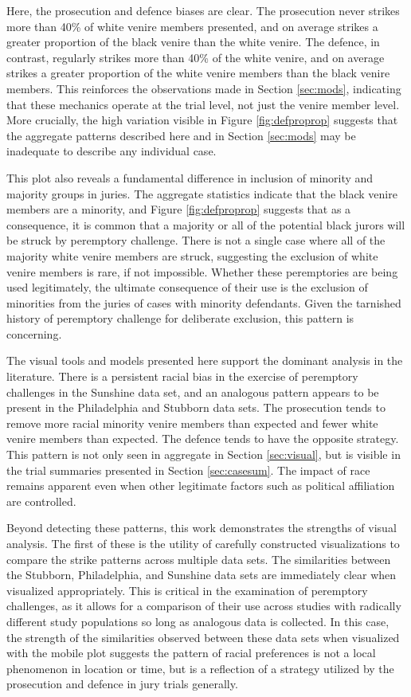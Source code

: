 \documentclass[12pt]{article}
\begin{document}
Here, the prosecution and defence biases are clear. The prosecution never strikes more than 40\% of white venire members presented, and on average strikes a greater proportion of the black venire than the white venire. The defence, in contrast, regularly strikes more than 40\% of the white venire, and on average strikes a greater proportion of the white venire members than the black venire members. This reinforces the observations made in Section \ref{sec:mods}, indicating that these mechanics operate at the trial level, not just the venire member level. More crucially, the high variation visible in Figure \ref{fig:defproprop} suggests that the aggregate patterns described here and in Section \ref{sec:mods} may be inadequate to describe any individual case.

This plot also reveals a fundamental difference in inclusion of minority and majority groups in juries. The aggregate statistics indicate that the black venire members are a minority, and Figure \ref{fig:defproprop} suggests that as a consequence, it is common that a majority or all of the potential black jurors will be struck by peremptory challenge. There is not a single case where all of the majority white venire members are struck, suggesting the exclusion of white venire members is rare, if not impossible. Whether these peremptories are being used legitimately, the ultimate consequence of their use is the exclusion of minorities from the juries of cases with minority defendants. Given the tarnished history of peremptory challenge for deliberate exclusion, this pattern is concerning.


The visual tools and models presented here support the dominant analysis in the literature. There is a persistent racial bias in the exercise of peremptory challenges in the Sunshine data set, and an analogous pattern appears to be present in the Philadelphia and Stubborn data sets. The prosecution tends to remove more racial minority venire members than expected and fewer white venire members than expected. The defence tends to have the opposite strategy. This pattern is not only seen in aggregate in Section \ref{sec:visual}, but is visible in the trial summaries presented in Section \ref{sec:casesum}. The impact of race remains apparent even when other legitimate factors such as political affiliation are controlled.

Beyond detecting these patterns, this work demonstrates the strengths of visual analysis. The first of these is the utility of carefully constructed visualizations to compare the strike patterns across multiple data sets. The similarities between the Stubborn, Philadelphia, and Sunshine data sets are immediately clear when visualized appropriately. This is critical in the examination of peremptory challenges, as it allows for a comparison of their use across studies with radically different study populations so long as analogous data is collected. In this case, the strength of the similarities observed between these data sets when visualized with the mobile plot suggests the pattern of racial preferences is not a local phenomenon in location or time, but is a reflection of a strategy utilized by the prosecution and defence in jury trials generally.
\end{document}
